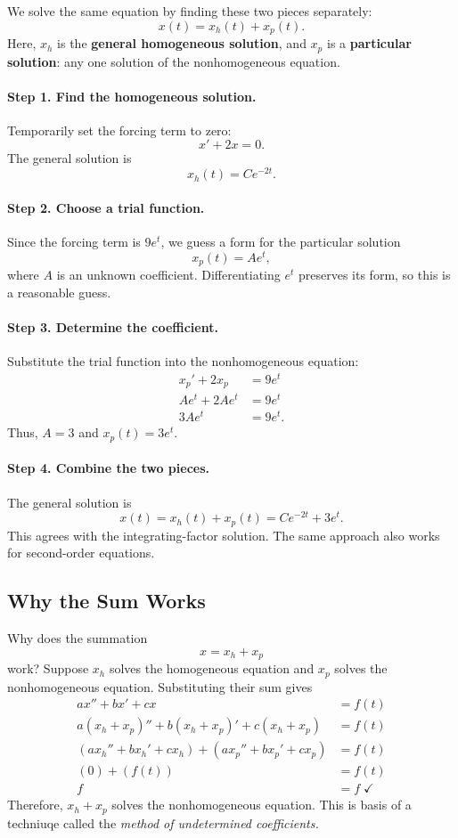 \documentclass[10pt,letterpaper]{article}
\begin{document}
We solve the same equation by finding these two pieces
separately:
\[
x(t)=x_h(t)+x_p(t).
\]
Here, $x_h$ is the \textbf{general homogeneous solution},
and $x_p$ is a \textbf{particular solution}: any one
solution of the nonhomogeneous equation.

\paragraph{Step 1. Find the homogeneous solution.}
Temporarily set the forcing term to zero:
\[
x'+2x=0.
\]
The general solution is
\[
x_h(t)=Ce^{-2t}.
\]

\paragraph{Step 2. Choose a trial function.}
Since the forcing term is $9e^t$, we guess a form for the particular solution
\[
x_p(t)=Ae^t,
\]
where $A$ is an unknown coefficient. Differentiating $e^t$
preserves its form, so this is a reasonable guess.

\paragraph{Step 3. Determine the coefficient.}
Substitute the trial function into the nonhomogeneous equation:
\begin{align*}
x_p'+2x_p&=9e^t\\
Ae^t+2Ae^t&=9e^t\\
3Ae^t&=9e^t.
\end{align*}
Thus, $A=3$ and $x_p(t)=3e^t$.

\paragraph{Step 4. Combine the two pieces.}
The general solution is
\[
\boxed{x(t)=x_h(t)+x_p(t)=Ce^{-2t}+3e^t.}
\]
This agrees with the integrating-factor solution.
The same approach also works for second-order equations.

\subsection{Why the Sum Works}
Why does the summation 
$$
    x=x_h+x_p
$$
work?
Suppose $x_h$ solves the homogeneous equation and $x_p$
solves the nonhomogeneous equation. Substituting their sum gives
\begin{align*}
ax''+bx'+cx&=f(t)\\
a(x_h+x_p)''+b(x_h+x_p)'+c(x_h+x_p)&=f(t)\\
(ax_h''+bx_h'+cx_h)+(ax_p''+bx_p'+cx_p)&=f(t)\\
(0)+(f(t))&=f(t)\\
f&=f \; \checkmark
\end{align*}
Therefore, $x_h+x_p$ solves the nonhomogeneous equation. This is basis of a techniuqe called the \textit{method of undetermined coefficients.}
\end{document}
